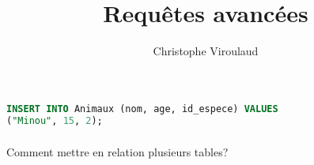 \documentclass[svgnames,11pt]{beamer}
\author[]{Christophe Viroulaud}
\title{Requêtes avancées}
\date{\framebox{\textbf{BDD 06}}}
\institute{Terminale - NSI}
\begin{document}
\begin{frame}
\titlepage
\end{frame}
\begin{frame}[fragile]
    \frametitle{}

\begin{center}
\begin{lstlisting}[language=SQL , basicstyle=\ttfamily\small, xleftmargin=1em, xrightmargin=0em]
INSERT INTO Animaux (nom, age, id_espece) VALUES 
("Minou", 15, 2);
\end{lstlisting}
\label{CODE}
\end{center}
\end{frame}
\begin{frame}
    \frametitle{}

    \begin{framed}
        \centering Comment mettre en relation plusieurs tables?
    \end{framed}

\end{frame}
\end{document}
